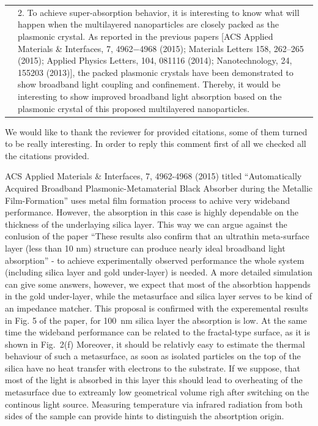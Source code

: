 \documentclass[a4paper]{article}
\begin{document}




\begin{tabular}[!H]{l|p{}}
  \quad & 2. To achieve super-absorption behavior, it is interesting
  to know what will happen when the multilayered nanoparticles are
  closely packed as the plasmonic crystal. As reported in the previous
  papers [ACS Applied Materials \& Interfaces, 7, 4962−4968 (2015);
  Materials Letters 158, 262–265 (2015); Applied Physics Letters, 104,
  081116 (2014); Nanotechnology, 24, 155203 (2013)], the packed
  plasmonic crystals have been demonstrated to show broadband light
  coupling and confinement. Thereby, it would be interesting to show
  improved broadband light absorption based on the plasmonic crystal
  of this proposed multilayered nanoparticles. 
\end{tabular}

We would like to thank the reviewer for provided citations, some of
them turned to be really interesting. In order to reply this comment
first of all we checked all the citations provided.

ACS Applied Materials \& Interfaces, 7, 4962-4968 (2015) titled
``Automatically Acquired Broadband Plasmonic-Metamaterial Black
Absorber during the Metallic Film-Formation'' uses metal film
formation process to achive very wideband performance. However, the
absorption in this case is highly dependable on the thickness of the
underlaying silica layer.  This way we can argue against the conlusion
of the paper ``These results also confirm that an ultrathin
meta-surface layer (less than 10 nm) structure can produce nearly
ideal broadband light absorption'' - to achieve experimentally
observed performance the whole system (including silica layer and gold
under-layer) is needed. A more detailed simulation can give some
answers, however, we expect that most of the absorbtion happends in
the gold under-layer, while the metasurface and silica layer serves to
be kind of an impedance matcher.  This proposal is confirmed with the
experemental results in Fig. 5 of the paper, for 100~nm silica layer
the absorption is low.  At the same time the wideband performance can
be related to the fractal-type surface, as it is shown in Fig.~2(f)
Moreover, it should be relativly easy to estimate the thermal
behaviour of such a metasurface, as soon as isolated particles on the
top of the silica have no heat transfer with electrons to the
substrate.  If we suppose, that most of the light is absorbed in this
layer this should lead to overheating of the metasurface due to
extreamly low geometrical volume righ after switching on the continous
light source. Measuring temperature via infrared radiation from both
sides of the sample can provide hints to distinguish the absortption
origin.
\end{document}
